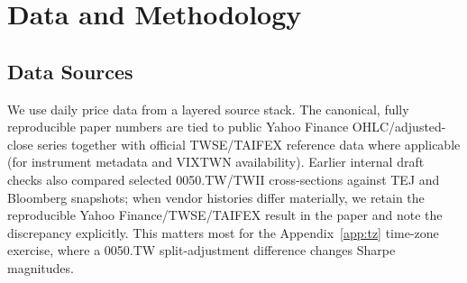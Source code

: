 
\section{Data and Methodology}
\label{sec:data}

\subsection{Data Sources}

We use daily price data from a layered source stack. The canonical, fully reproducible paper numbers are tied to public Yahoo Finance OHLC/adjusted-close series together with official TWSE/TAIFEX reference data where applicable (for instrument metadata and VIXTWN availability). Earlier internal draft checks also compared selected 0050.TW/TWII cross-sections against TEJ and Bloomberg snapshots; when vendor histories differ materially, we retain the reproducible Yahoo Finance/TWSE/TAIFEX result in the paper and note the discrepancy explicitly. This matters most for the Appendix~\ref{app:tz} time-zone exercise, where a 0050.TW split-adjustment difference changes Sharpe magnitudes.

